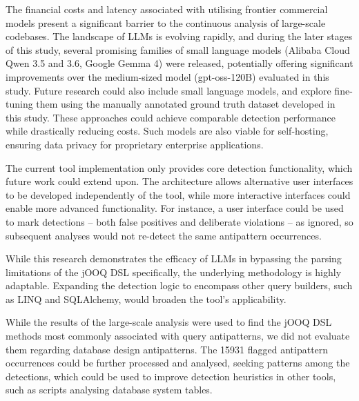 The financial costs and latency associated with utilising frontier commercial models present a significant barrier to the continuous analysis of large-scale codebases. The landscape of LLMs is evolving rapidly, and during the later stages of this study, several promising families of small language models (Alibaba Cloud Qwen 3.5 and 3.6, Google Gemma 4) were released, potentially offering significant improvements over the medium-sized model (gpt-oss-120B) evaluated in this study. Future research could also include small language models, and explore fine-tuning them using the manually annotated ground truth dataset developed in this study. These approaches could achieve comparable detection performance while drastically reducing costs. Such models are also viable for self-hosting, ensuring data privacy for proprietary enterprise applications.

The current tool implementation only provides core detection functionality, which future work could extend upon. The architecture allows alternative user interfaces to be developed independently of the tool, while more interactive interfaces could enable more advanced functionality. For instance, a user interface could be used to mark detections -- both false positives and deliberate violations -- as ignored, so subsequent analyses would not re-detect the same antipattern occurrences.

While this research demonstrates the efficacy of LLMs in bypassing the parsing limitations of the jOOQ DSL specifically, the underlying methodology is highly adaptable. Expanding the detection logic to encompass other query builders, such as LINQ and SQLAlchemy, would broaden the tool's applicability.

While the results of the large-scale analysis were used to find the jOOQ DSL methods most commonly associated with query antipatterns, we did not evaluate them regarding database design antipatterns. The \num{15931} flagged antipattern occurrences could be further processed and analysed, seeking patterns among the detections, which could be used to improve detection heuristics in other tools, such as scripts analysing database system tables.
